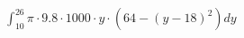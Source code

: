 \documentclass[12pt]{article}
\begin{document}
    \begin{equation*}
        \begin{split}
            \int_{10}^{26} \pi \cdot 9.8 \cdot 1000 \cdot y \cdot (64-(y-18)^2)dy
        \end{split}
    \end{equation*}
\end{document}
